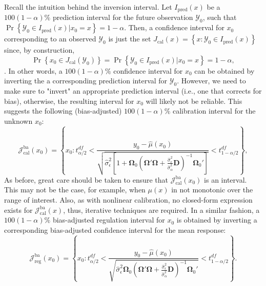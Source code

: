 \documentclass[cmfont,usenames,dvipsnames,leqno]{afit-etd}\usepackage[]{graphicx}\usepackage[]{color}
\newcommand{\mc}[1]{\ensuremath{\mathcal{#1}}}
\newcommand{\wh}[1]{\ensuremath{\widehat{#1}}}
\begin{document}
Recall the intuition behind the inversion interval. Let $I_\mathrm{pred}(x)$ be a $100(1 - \alpha)\%$ prediction interval for the future observation $\mc{Y}_0$, such that $\Pr\left\{ \mc{Y}_0 \in I_\mathrm{pred}(x) | x_0 = x \right\} = 1 - \alpha$. Then, a confidence interval for $x_0$ corresponding to an observed $\mc{Y}_0$ is just the set $J_\mathrm{cal}(x) = \left\{x : \mc{Y}_0 \in I_\mathrm{pred}(x)\right\}$ since, by construction, 
\begin{equation*}
\Pr\left\{x_0 \in J_\mathrm{cal}(\mc{Y}_0)\right\} = \Pr\left\{\mc{Y}_0 \in I_\mathrm{pred}(x) | x_0 = x\right\} = 1 - \alpha,
\end{equation*}
\citep{clark_calibration_1980}. In other words, a $100(1 - \alpha)\%$ confidence interval for $x_0$ can be obtained by inverting the a corresponding prediction interval for $\mc{Y}_0$. However, we need to make sure to "invert" an appropriate prediction interval (i.e., one that corrects for bias), otherwise, the resulting interval for $x_0$ will likely not be reliable. This suggests the following (bias-adjusted) $100(1-\alpha)\%$ calibration interval for the unknown $x_0$:
\begin{equation}
\label{eqn:bc-inversion-interval}
  \mc{J}_\mathrm{cal}^{\mathrm{ba}}(x_0) = \left\{x_0: t_{\alpha/2}^{df} < \frac{y_0 - \wh{\mu}(x_0)}{\sqrt{\wh{\sigma}_\epsilon^2\left[1 + \bm{\Omega}_0\left(\bm{\Omega}'\bm{\Omega} + \frac{\wh{\sigma}_\epsilon^2}{\wh{\sigma}_\alpha^2}\bm{D}\right)^{-1}\bm{\Omega}_0'\right]}} < t_{1-\alpha/2}^{df}\right\},
\end{equation}
As before, great care should be taken to ensure that $\mc{J}_\mathrm{cal}^{\mathrm{ba}}(x_0)$ is an interval. This may not be the case, for example, when $\mu(x)$ in not monotonic over the range of interest. Also, as with nonlinear calibration, no closed-form expression exists for $\mc{J}_\mathrm{cal}^{\mathrm{ba}}(x)$, thus, iterative techniques are required. In a similar fashion, a $100(1-\alpha)\%$ bias-adjusted regulation interval for $x_0$ is obtained by inverting a corresponding bias-adjusted confidence interval for the mean response:
\begin{equation*}
  \mc{J}_\mathrm{reg}^{\mathrm{ba}}(x_0) = \left\{x_0: t_{\alpha/2}^{df} < \frac{y_0 - \wh{\mu}(x_0)}{\sqrt{\wh{\sigma}_\epsilon^2\bm{\Omega}_0\left(\bm{\Omega}'\bm{\Omega} + \frac{\wh{\sigma}_\epsilon^2}{\wh{\sigma}_\alpha^2}\bm{D}\right)^{-1}\bm{\Omega}_0'}} < t_{1-\alpha/2}^{df}\right\}.
\end{equation*}
\end{document}
